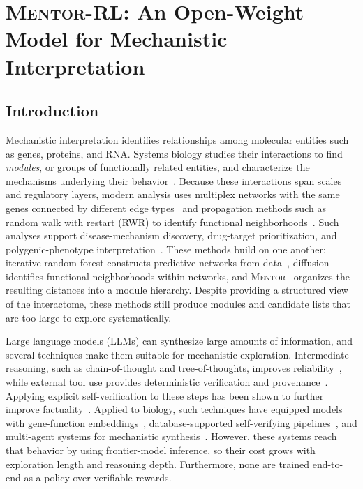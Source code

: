 \chapter{\textsc{Mentor-RL}: An Open-Weight Model for Mechanistic Interpretation}\label{ch4:mentor-rl}

\section{Introduction}

Mechanistic interpretation identifies relationships among molecular entities such as genes, proteins, and RNA. Systems biology studies their interactions to find \textit{modules}, or groups of functionally related entities, and characterize the mechanisms underlying their behavior~\cite{hartwell1999molecular, barabasi2004network}. Because these interactions span scales and regulatory layers, modern analysis uses multiplex networks with the same genes connected by different edge types~\cite{barabasi2011network, mucha2010community, de2013mathematical} and propagation methods such as random walk with restart (RWR) to identify functional neighborhoods~\cite{kohler2008walking, cowen2017network}. Such analyses support disease-mechanism discovery, drug-target prioritization, and polygenic-phenotype interpretation~\cite{menche2015uncovering}. These methods build on one another: iterative random forest constructs predictive networks from data~\cite{basu2018iterative,cliff2019high}, diffusion identifies functional neighborhoods within networks, and \textsc{Mentor}~\cite{mentor} organizes the resulting distances into a module hierarchy. Despite providing a structured view of the interactome, these methods still produce modules and candidate lists that are too large to explore systematically.

Large language models (LLMs) can synthesize large amounts of information, and several techniques make them suitable for mechanistic exploration. Intermediate reasoning, such as chain-of-thought and tree-of-thoughts, improves reliability~\cite{wei2022chain,kojima2022large}, while external tool use provides deterministic verification and provenance~\cite{schick2023toolformer, yao2022react}. Applying explicit self-verification to these steps has been shown to further improve factuality~\cite{madaan2023selfrefine, shinn2023reflexion}. Applied to biology, such techniques have equipped models with gene-function embeddings~\cite{chen2025simple}, database-supported self-verifying pipelines~\cite{wang2025geneagent}, and multi-agent systems for mechanistic synthesis~\cite{mentor-ia, eubiota}. However, these systems reach that behavior by using frontier-model inference, so their cost grows with exploration length and reasoning depth. Furthermore, none are trained end-to-end as a policy over verifiable rewards.

